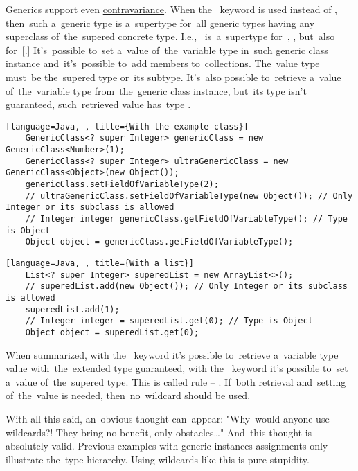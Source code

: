 \noindent Generics support even \hyperref[contravariance]{contravariance}.
When the~ keyword is used instead of , then~such a~generic type is a~supertype for~all generic types having any superclass of~the~supered concrete type.
I.e.,~ is~a~supertype for~, , but~also for~[.]
It's~possible to~set a~value of~the~variable type in~such generic class instance and~it's~possible to~add members to~collections.
The~value type must~be the~supered type or~its subtype.
It's~also possible to~retrieve a~value of~the~variable type from~the~generic class instance, but~its type isn't guaranteed, such~retrieved value has~type .
\newpage

\begin{lstlisting}[language=Java, , title={With the example class}]
    GenericClass<? super Integer> genericClass = new GenericClass<Number>(1);
    GenericClass<? super Integer> ultraGenericClass = new GenericClass<Object>(new Object());
    genericClass.setFieldOfVariableType(2);
    // ultraGenericClass.setFieldOfVariableType(new Object()); // Only Integer or its subclass is allowed
    // Integer integer genericClass.getFieldOfVariableType(); // Type is Object
    Object object = genericClass.getFieldOfVariableType();
\end{lstlisting}
\begin{lstlisting}[language=Java, , title={With a list}]
    List<? super Integer> superedList = new ArrayList<>();
    // superedList.add(new Object()); // Only Integer or its subclass is allowed
    superedList.add(1);
    // Integer integer = superedList.get(0); // Type is Object
    Object object = superedList.get(0);
\end{lstlisting}
\newline

\noindent When summarized, with the~ keyword it's possible to~retrieve a~variable type value with~the~extended type guaranteed, with the~ keyword it's possible to~set a~value of~the~supered type.
This is called  rule -- .
If~both retrieval and~setting of~the~value is needed, then~no~wildcard should be used.

With all this said, an~obvious thought can~appear:
"Why~would anyone use wildcards?!
They bring no benefit, only obstacles\dots"
And~this thought is absolutely valid.
Previous examples with generic instances assignments only illustrate the~type hierarchy.
Using wildcards like this is pure stupidity.

